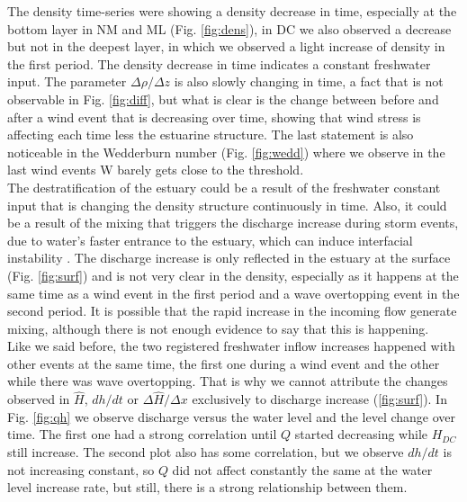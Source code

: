 \documentclass[tesis.tex]{subfiles}
\begin{document}
The density time-series were showing a density decrease in time, especially at the bottom layer in NM and ML (Fig. \ref{fig:dens}), in DC we also observed a decrease but not in the deepest layer, in which we observed a light increase of density in the first period. The density decrease in time indicates a constant freshwater input. The parameter $\Delta \rho / \Delta z$ is also slowly changing in time, a fact that is not observable in Fig. \ref{fig:diff}, but what is clear is the change between before and after a wind event that is decreasing over time, showing that wind stress is affecting each time less the estuarine structure. The last statement is also noticeable in the Wedderburn number (Fig. \ref{fig:wedd}) where we observe in the last wind events W barely gets close to the threshold.\\

The destratification of the estuary could be a result of the freshwater constant input that is changing the density structure continuously in time. Also, it could be a result of the mixing that triggers the discharge increase during storm events, due to water's faster entrance to the estuary, which can induce interfacial instability \citep{Katopodes2018}. The discharge increase is only reflected in the estuary at the surface (Fig. \ref{fig:surf}) and is not very clear in the density, especially as it happens at the same time as a wind event in the first period and a wave overtopping event in the second period. It is possible that the rapid increase in the incoming flow generate mixing, although there is not enough evidence to say that this is happening.\\

Like we said before, the two registered freshwater inflow increases happened with other events at the same time, the first one during a wind event and the other while there was wave overtopping. That is why we cannot attribute the changes observed in $\hat{H}$, $dh/dt$ or $\Delta \hat{H}/\Delta x$ exclusively to discharge increase (\ref{fig:surf}). In Fig. \ref{fig:qh} we observe discharge versus the water level and the level change over time. The first one had a strong correlation until $Q$ started decreasing while $H_{DC}$ still increase. The second plot also has some correlation, but we observe $dh/dt$ is not increasing constant, so $Q$ did not affect constantly the same at the water level increase rate, but still, there is a strong relationship between them.\\
\end{document}
